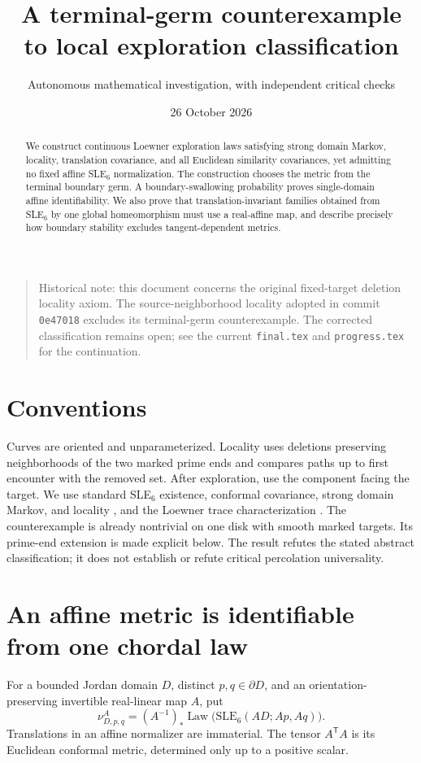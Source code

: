 \documentclass[11pt]{article}
\title{A terminal-germ counterexample to local exploration classification}
\author{Autonomous mathematical investigation, with independent critical checks}
\date{26 October 2026}
\theoremstyle{definition}\newtheorem{definition}[theorem]{Definition}
\theoremstyle{remark}\newtheorem{remark}[theorem]{Remark}
\newcommand{\SLE}{\mathrm{SLE}_6}
\newcommand{\Law}{\operatorname{Law}}
\newcommand{\nuA}[4]{\nu^{#1}_{#2,#3,#4}}
\begin{document}
\maketitle
\begin{quote}\small
Historical note: this document concerns the original fixed-target deletion
locality axiom. The source-neighborhood locality adopted in commit
\texttt{0e47018} excludes its terminal-germ counterexample. The corrected
classification remains open; see the current \texttt{final.tex} and
\texttt{progress.tex} for the continuation.
\end{quote}
\begin{abstract}We construct continuous Loewner exploration laws satisfying strong domain Markov, locality, translation covariance, and all Euclidean similarity covariances, yet admitting no fixed affine SLE$_6$ normalization. The construction chooses the metric from the terminal boundary germ. A boundary-swallowing probability proves single-domain affine identifiability. We also prove that translation-invariant families obtained from SLE$_6$ by one global homeomorphism must use a real-affine map, and describe precisely how boundary stability excludes tangent-dependent metrics.\end{abstract}\section{Conventions}Curves are oriented and unparameterized. Locality uses deletions preserving neighborhoods of the two marked prime ends and compares paths up to first encounter with the removed set. After exploration, use the component facing the target. We use standard SLE$_6$ existence, conformal covariance, strong domain Markov, and locality \cite{lawler}, and the Loewner trace characterization \cite{yuan}. The counterexample is already nontrivial on one disk with smooth marked targets. Its prime-end extension is made explicit below. The result refutes the stated abstract classification; it does not establish or refute critical percolation universality.
\section{An affine metric is identifiable from one chordal law}
\label{sec:identifiability}

For a bounded Jordan domain $D$, distinct $p,q\in\partial D$, and an
orientation-preserving invertible real-linear map $A$, put
\begin{equation}
 \nuA{A}{D}{p}{q}
 = (A^{-1})_*\Law\bigl(\SLE(AD;Ap,Aq)\bigr).
 \label{eq:affine-law}
\end{equation}
Translations in an affine normalizer are immaterial. The tensor
$A^{\mathsf T}A$ is its Euclidean conformal metric, determined only up to a
positive scalar.
\end{document}
